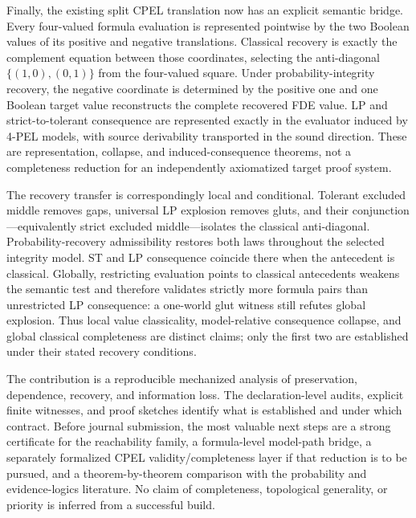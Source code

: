 Finally, the existing split CPEL translation now has an explicit semantic bridge. Every four-valued formula evaluation is represented pointwise by the two Boolean values of its positive and negative translations. Classical recovery is exactly the complement equation between those coordinates, selecting the anti-diagonal \(\{(1,0),(0,1)\}\) from the four-valued square. Under probability-integrity recovery, the negative coordinate is determined by the positive one and one Boolean target value reconstructs the complete recovered FDE value. LP and strict-to-tolerant consequence are represented exactly in the evaluator induced by 4-PEL models, with source derivability transported in the sound direction. These are representation, collapse, and induced-consequence theorems, not a completeness reduction for an independently axiomatized target proof system.

The recovery transfer is correspondingly local and conditional. Tolerant excluded middle removes gaps, universal LP explosion removes gluts, and their conjunction---equivalently strict excluded middle---isolates the classical anti-diagonal. Probability-recovery admissibility restores both laws throughout the selected integrity model. ST and LP consequence coincide there when the antecedent is classical. Globally, restricting evaluation points to classical antecedents weakens the semantic test and therefore validates strictly more formula pairs than unrestricted LP consequence: a one-world glut witness still refutes global explosion. Thus local value classicality, model-relative consequence collapse, and global classical completeness are distinct claims; only the first two are established under their stated recovery conditions.

The contribution is a reproducible mechanized analysis of preservation, dependence, recovery, and information loss. The declaration-level audits, explicit finite witnesses, and proof sketches identify what is established and under which contract. Before journal submission, the most valuable next steps are a strong certificate for the reachability family, a formula-level model-path bridge, a separately formalized CPEL validity/completeness layer if that reduction is to be pursued, and a theorem-by-theorem comparison with the probability and evidence-logics literature. No claim of completeness, topological generality, or priority is inferred from a successful build.
